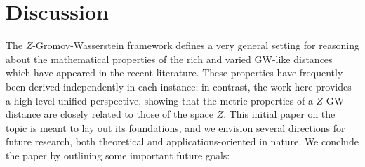 \documentclass[twoside,11pt]{article}
\theoremstyle{definition}
\begin{document}

\section{Discussion}\label{sec:discussion}

The $Z$-Gromov-Wasserstein framework defines a very general setting for reasoning about the mathematical properties of the rich and varied GW-like distances which have appeared in the recent literature. These properties have frequently been derived independently in each instance; in contrast, the work here provides a high-level unified perspective, showing that the metric properties of a $Z$-GW distance are closely related to those of the space $Z$. This initial paper on the topic is meant to lay out its foundations, and we envision several directions for future research, both theoretical and applications-oriented in nature. We conclude the paper by outlining some important future goals:
\end{document}
